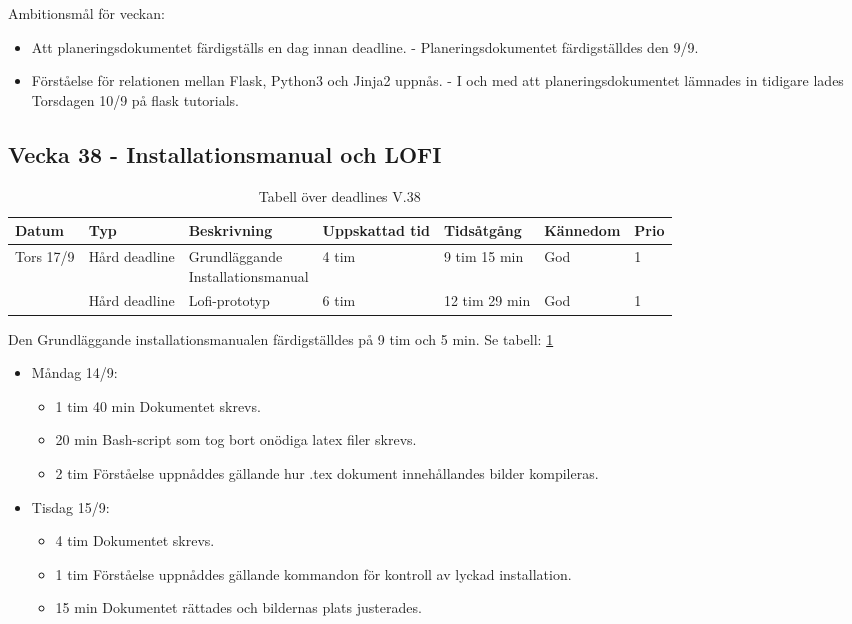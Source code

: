 \documentclass{TDP003mall}
\begin{document}
      Ambitionsmål för veckan:
      \begin{itemize}
      \item Att planeringsdokumentet färdigställs en dag innan deadline. - Planeringsdokumentet färdigställdes den 9/9.
      \item Förståelse för relationen mellan Flask, Python3 och Jinja2 uppnås. - I och med att planeringsdokumentet lämnades in tidigare lades Torsdagen 10/9 på flask tutorials.
      \end{itemize}
      

\newpage

\subsection*{Vecka 38 - Installationsmanual och LOFI}
\begin{table}[h!]
  \caption{Tabell över deadlines V.38\label{tab:3}}
\begin{tabularx}{\linewidth}{|l|l|l|l|l|l|l|}
  \hline
  Datum     & Typ           & Beskrivning                                        & Uppskattad tid & Tidsåtgång    & Kännedom & Prio\\
  \hline                                                    
  Tors 17/9 & Hård deadline & \makecell[tl]{Grundläggande \\Installationsmanual} & 4 tim          & 9 tim 15 min  & God      & 1\\
  \hline                                                    
            & Hård deadline & Lofi-prototyp                                      & 6 tim          & 12 tim 29 min & God      & 1\\
  \hline
\end{tabularx}  
  \end{table}

Den Grundläggande installationsmanualen färdigställdes på 9 tim och 5 min. Se tabell: \ref{tab:3}
\begin{itemize}
  \item Måndag 14/9:
  \begin{itemize}
    \item 1 tim 40 min Dokumentet skrevs.
    \item 20 min Bash-script som tog bort onödiga latex filer skrevs.
    \item 2 tim Förståelse uppnåddes gällande hur .tex dokument innehållandes bilder kompileras.
  \end{itemize}
  \item Tisdag 15/9:
  \begin{itemize}
    \item 4 tim Dokumentet skrevs.
    \item 1 tim Förståelse uppnåddes gällande kommandon för kontroll av lyckad installation.
    \item 15 min Dokumentet rättades och bildernas plats justerades.
  \end{itemize}
\end{itemize}
\end{document}
